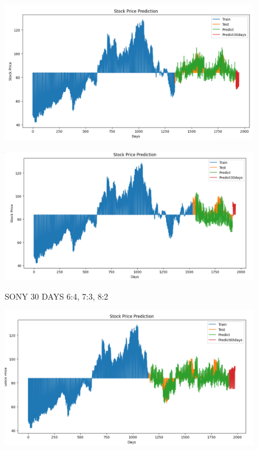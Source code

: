 \documentclass{article}
\begin{document}
\begin{multicols}{2}
\begin{figure}[H]
\begin{minipage}{0.15\textwidth}
    \label{fig:1}
    \end{minipage}%
    \begin{minipage}{0.15\textwidth}
    \centering
    \includegraphics[width=1\textwidth]{Image/N_Beat/N_BEAT_7_3_SONY_30DAYS.png}
  
    \label{fig:2}
    \end{minipage}%
    \begin{minipage}{0.15\textwidth}
    \centering
    \includegraphics[width=1\textwidth]{Image/N_Beat/N_BEAT_8_2_SONY_30DAYS.png}

    \label{fig:3}
    \end{minipage}
    \caption{SONY 30 DAYS  6:4, 7:3, 8:2 }
\end{figure}


\begin{figure}[H]
    \centering
    \begin{minipage}{0.15\textwidth}
    \centering
    \includegraphics[width=1\textwidth]{Image/N_Beat/N_BEAT_6_4_SONY_60DAYS.png}
   

\end{minipage}
\end{figure}
\end{multicols}
\end{document}
